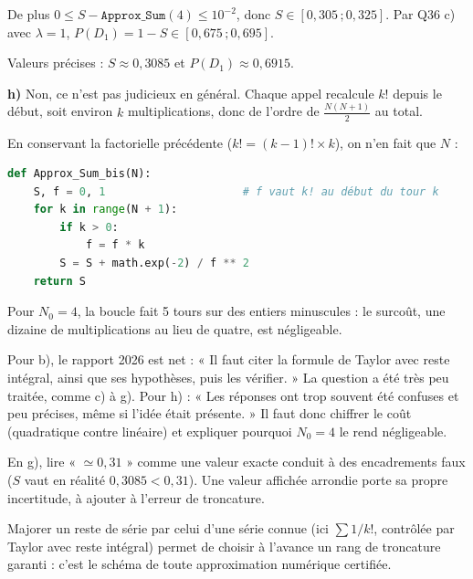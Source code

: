 \documentclass[11pt,a4paper]{article}
\newcommand{\equationajustee}[1]{%
  \sbox{\boiteequation}{$\displaystyle #1$}%
  \ifdim\wd\boiteequation>\linewidth
    \[\resizebox{\linewidth}{!}{\usebox{\boiteequation}}\]%
  \else
    \[#1\]%
  \fi}
\begin{document}
De plus \(0\le S-\texttt{Approx\_Sum}(4)\le10^{-2}\), donc \(S\in[0{,}305\,;0{,}325]\). Par Q36 c) avec \(\lambda=1\), \(P(D_1)=1-S\in[0{,}675\,;0{,}695]\).

\equationajustee{\boxed{S\approx0{,}3\quad\text{et}\quad P(D_1)\approx0{,}7\quad\text{\text{à} }10^{-1}\text{ \text{près}.}}}

Valeurs précises : \(S\approx0{,}3085\) et \(P(D_1)\approx0{,}6915\).

\textbf{h)} Non, ce n'est pas judicieux en général. Chaque appel recalcule \(k!\) depuis le début, soit environ \(k\) multiplications, donc de l'ordre de \(\frac{N(N+1)}2\) au total.

En conservant la factorielle précédente (\(k!=(k-1)!\times k\)), on n'en fait que \(N\) :

\begin{lstlisting}[language=Python]
def Approx_Sum_bis(N):
    S, f = 0, 1                     # f vaut k! au début du tour k
    for k in range(N + 1):
        if k > 0:
            f = f * k
        S = S + math.exp(-2) / f ** 2
    return S
\end{lstlisting}

Pour \(N_0=4\), la boucle fait 5 tours sur des entiers minuscules : le surcoût, une dizaine de multiplications au lieu de quatre, est négligeable.

\begin{jury}

Pour b), le rapport 2026 est net : « Il faut citer la formule de Taylor avec reste intégral, ainsi que ses hypothèses, puis les vérifier. » La question a été très peu traitée, comme c) à g). Pour h) : « Les réponses ont trop souvent été confuses et peu précises, même si l'idée était présente. » Il faut donc chiffrer le coût (quadratique contre linéaire) et expliquer pourquoi \(N_0=4\) le rend négligeable.

\end{jury}

\begin{piege}

En g), lire « \(\simeq0{,}31\) » comme une valeur exacte conduit à des encadrements faux (\(S\) vaut en réalité \(0{,}3085<0{,}31\)). Une valeur affichée arrondie porte sa propre incertitude, à ajouter à l'erreur de troncature.

\end{piege}

\begin{methode}

Majorer un reste de série par celui d'une série connue (ici \(\sum1/k!\), contrôlée par Taylor avec reste intégral) permet de choisir à l'avance un rang de troncature garanti : c'est le schéma de toute approximation numérique certifiée.

\end{methode}
\end{document}
